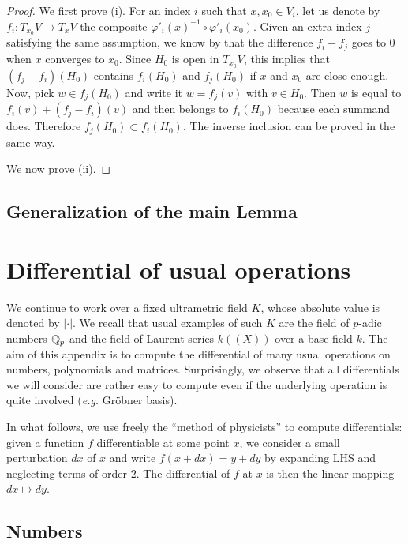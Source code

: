 \documentclass{lms}
\begin{document}
\begin{proof}
We first prove (i). For an index $i$ such that $x, x_0 \in V_i$, let us 
denote by $f_i : T_{x_0} V \to T_x V$ the composite $\varphi'_i(x)^{-1} 
\circ \varphi'_i(x_0)$. Given an extra index $j$ satisfying the same
assumption, we know by  that the difference
$f_i - f_j$ goes to $0$ when $x$ converges to $x_0$. Since $H_0$ is open
in $T_{x_0} V$, this implies that $(f_j - f_i)(H_0)$ contains $f_i(H_0)$ and 
$f_j(H_0)$ if $x$ and $x_0$ are close enough. Now, pick $w \in f_j(H_0)$ and 
write it $w = f_j(v)$ with $v \in H_0$. Then $w$ is equal to $f_i(v) + 
(f_j - f_i)(v)$ and then belongs to $f_i(H_0)$ because each summand does. 
Therefore $f_j(H_0) \subset f_i(H_0)$. The inverse inclusion can be proved 
in the same way.

We now prove (ii). 
\end{proof}

\subsection{Generalization of the main Lemma}


\section{Differential of usual operations}
\label{ssec:differentials}

We continue to work over a fixed ultrametric field $K$, whose absolute 
value is denoted by $|\cdot|$. We recall that usual examples of such $K$ 
are the field of $p$-adic numbers $\mathbb Q_p$ and the field of Laurent series 
$k((X))$ over a base field $k$. The aim of this appendix is to compute 
the differential of many usual operations on numbers, polynomials and 
matrices. Surprisingly, we observe that all differentials we will 
consider are rather easy to compute even if the underlying operation is 
quite involved (\emph{e.g.} Gr\"obner basis).

In what follows, we use freely the ``method of physicists'' to compute 
differentials: given a function $f$ differentiable at some point $x$, we 
consider a small perturbation $dx$ of $x$ and write $f(x+dx) = y + dy$ 
by expanding LHS and neglecting terms of order $2$. The differential of 
$f$ at $x$ is then the linear mapping $dx \mapsto dy$.

\subsection{Numbers}
\end{document}
